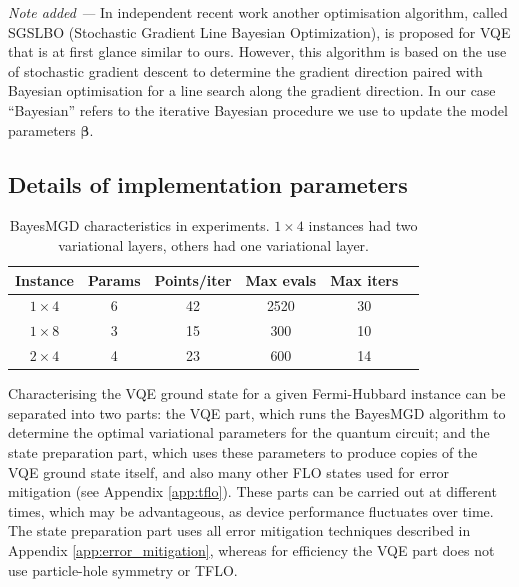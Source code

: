 \documentclass[aps,prb,twoside,superscriptaddress,longbibliography,nofootinbib,floatfix, notitlepage,twocolumn]{revtex4-1}
\renewcommand{\vec}[1]{\boldsymbol{#1}}
\begin{document}
\emph{Note added ---} In independent recent work\cite{tamiya2021stochastic} 
another optimisation algorithm, called SGSLBO (Stochastic Gradient Line Bayesian Optimization), is proposed for VQE that is at first glance similar to ours. However, this algorithm is based on the use of stochastic gradient descent to determine the gradient direction paired with Bayesian optimisation for a line search along the gradient direction. In our case ``Bayesian'' refers to the iterative Bayesian procedure we use to update the model parameters $\vec{\beta}$.


\subsection{Details of implementation parameters}

\begin{table}[t]
    \centering
    \begin{tabular}{|c|c|c|c|c|c|}
    \hline
        Instance & Params & Points/iter & Max evals & Max iters\\
        \hline
        $1\times 4$ & 6 & 42 & 2520 & 30 \\
        $1\times 8$ & 3 & 15 & 300 & 10 \\
        $2\times 4$ & 4 & 23 & 600 & 14 \\
        \hline 
    \end{tabular}
    \caption{BayesMGD characteristics in experiments. $1\times 4$ instances had two variational layers, others had one variational layer.}
    \label{tab:bayesmgd}
\end{table}

Characterising the VQE ground state for a given Fermi-Hubbard instance can be separated into two parts: the VQE part, which runs the BayesMGD algorithm to determine the optimal variational parameters for the quantum circuit; and the state preparation part, which uses these parameters to produce copies of the VQE ground state itself, and also many other FLO states used for error mitigation (see Appendix \ref{app:tflo}). These parts can be carried out at different times, which may be advantageous, as device performance fluctuates over time. The state preparation part uses all error mitigation techniques described in Appendix \ref{app:error_mitigation}, whereas for efficiency the VQE part does not use particle-hole symmetry or TFLO.
\end{document}
